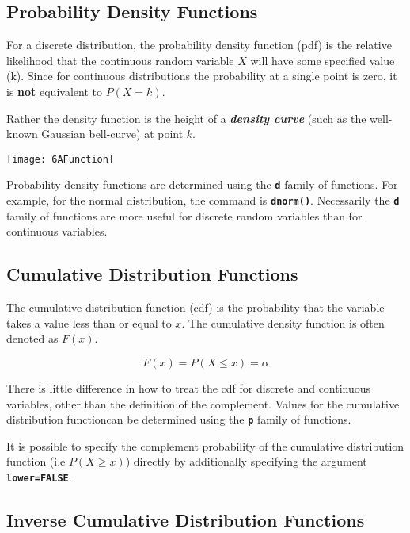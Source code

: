 \subsection{Probability Density Functions} 
For a discrete distribution, the probability density function (pdf) is the relative likelihood that the continuous random variable $X$ will have some specified value (k).
Since for continuous distributions the probability at a single point is zero, it is \textbf{not} equivalent to $P(X = k)$.

Rather the density function is the height of a \textbf{\textit{density curve}} (such as the well-known Gaussian bell-curve) at point $k$.

\begin{center}
\texttt{[image: 6AFunction]}
\end{center}
 
%
 
Probability density functions are determined using the \texttt{\textbf{d}} family of functions. For example, for the normal distribution, the command is \texttt{\textbf{dnorm()}}. 
Necessarily the  \texttt{\textbf{d}} family of functions are more useful for discrete random variables than for continuous variables.

\subsection{Cumulative Distribution Functions}

The cumulative distribution function (cdf) is the probability that the variable takes a value less than or equal to $x$. The cumulative density function is often denoted as $F(x)$.
 
 \[F(x)= P(X \leq x) = \alpha \]

There is little difference in how to treat the cdf for discrete and continuous variables, other than the definition of the complement.
Values for the cumulative distribution functioncan be determined using the \texttt{\textbf{p}} family of functions. 

It is possible to specify the complement probability of the cumulative distribution function (i.e $P(X \geq x)$) directly by additionally specifying the argument \texttt{\textbf{lower=FALSE}}.
 
\subsection{Inverse Cumulative Distribution Functions}

